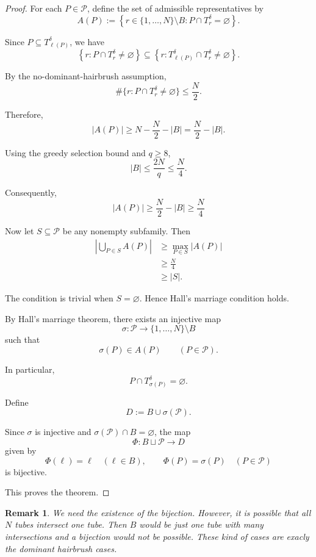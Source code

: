\documentclass[11pt, letterpaper]{nyjm}
\newtheorem{remark}[theorem]{Remark}
\begin{document}
\begin{proof}
	
	For each $P\in\mathcal P$, define the set
	of admissible representatives by
	\[
	A(P):=
	\left\{
	r\in\{1,\ldots,N\}\setminus B:
	P\cap T_r^\delta=\varnothing
	\right\}.
	\]
	
	Since $P\subseteq T_{\ell(P)}^\delta$, we have
	\[
	\left\{
	r:P\cap T_r^\delta\ne\varnothing
	\right\}
	\subseteq
	\left\{
	r:T_{\ell(P)}^\delta\cap T_r^\delta
	\ne\varnothing
	\right\}.
	\]
	
	By the no-dominant-hairbrush assumption,
	\[
	\#\{r:P\cap T_r^\delta\ne\varnothing\}
	\le \frac N2.
	\]
	
	Therefore,
	\[
	|A(P)|
	\ge N-\frac N2-|B|
	= \frac N2-|B|.
	\]
	
	Using the greedy selection bound and $q\ge8$,
	\[
	|B|\le\frac{2N}{q}\le\frac N4.
	\]
	
	Consequently,
	\[
	|A(P)|
	\ge\frac N2-|B|
	\ge\frac N4
	\]
	
	Now let $S\subseteq\mathcal P$ be any nonempty
	subfamily. Then
	\[
	\begin{aligned}
		\left|\bigcup_{P\in S}A(P)\right|
		&\ge \max_{P\in S}|A(P)|\\
		&\ge \frac N4 \\
		&\ge |S|.
	\end{aligned}
	\]
	
	The condition is trivial when $S=\varnothing$.
	Hence Hall's marriage condition holds.
	
	By Hall's marriage theorem, there exists
	an injective map
	\[
	\sigma:\mathcal P\longrightarrow
	\{1,\ldots,N\}\setminus B
	\]
	such that
	\[
	\sigma(P)\in A(P)
	\qquad(P\in\mathcal P).
	\]
	
	In particular,
	\[
	P\cap T_{\sigma(P)}^\delta=\varnothing.
	\]
	
	Define
	\[
	D:=B\cup\sigma(\mathcal P).
	\]
	
	Since $\sigma$ is injective and
	$\sigma(\mathcal P)\cap B=\varnothing$,
	the map
	\[
	\Phi:B\sqcup\mathcal P\longrightarrow D
	\]
	given by
	\[
	\Phi(\ell)=\ell\quad(\ell\in B),
	\qquad
	\Phi(P)=\sigma(P)\quad(P\in\mathcal P)
	\]
	is bijective.
	
	This proves the theorem.
\end{proof}

\begin{remark}
	We need the existence of the bijection. However, it is possible that all $N$ tubes intersect one tube. Then $B$ would be just one tube with many intersections and a bijection would not be possible. These kind of cases are exacly the dominant hairbrush cases.    
\end{remark}
\end{document}
